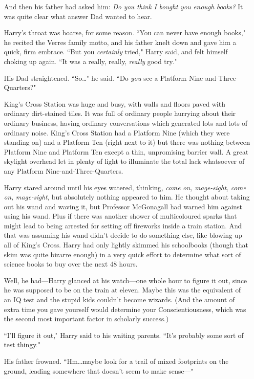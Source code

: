 And then his father had asked him: \emph{Do you think I bought you enough books?} It was quite clear what answer Dad wanted to hear.

Harry's throat was hoarse, for some reason. ``You can never have enough books," he recited the Verres family motto, and his father knelt down and gave him a quick, firm embrace. ``But you \emph{certainly} tried," Harry said, and felt himself choking up again. ``It was a really, really, \emph{really} good try."

His Dad straightened. ``So…" he said. ``Do \emph{you} see a Platform Nine-and-Three-Quarters?"

King's Cross Station was huge and busy, with walls and floors paved with ordinary dirt-stained tiles. It was full of ordinary people hurrying about their ordinary business, having ordinary conversations which generated lots and lots of ordinary noise. King's Cross Station had a Platform Nine (which they were standing on) and a Platform Ten (right next to it) but there was nothing between Platform Nine and Platform Ten except a thin, unpromising barrier wall. A great skylight overhead let in plenty of light to illuminate the total lack whatsoever of any Platform Nine-and-Three-Quarters.

Harry stared around until his eyes watered, thinking, \emph{come on, mage-sight, come on, mage-sight}, but absolutely nothing appeared to him. He thought about taking out his wand and waving it, but Professor McGonagall had warned him against using his wand. Plus if there was another shower of multicoloured sparks that might lead to being arrested for setting off fireworks inside a train station. And that was assuming his wand didn't decide to do something else, like blowing up all of King's Cross. Harry had only lightly skimmed his schoolbooks (though that skim was quite bizarre enough) in a very quick effort to determine what sort of science books to buy over the next 48 hours.

Well, he had—Harry glanced at his watch—one whole hour to figure it out, since he was supposed to be on the train at eleven. Maybe this was the equivalent of an IQ test and the stupid kids couldn't become wizards. (And the amount of extra time you gave yourself would determine your Conscientiousness, which was the second most important factor in scholarly success.)

``I'll figure it out," Harry said to his waiting parents. ``It's probably some sort of test thingy."

His father frowned. ``Hm…maybe look for a trail of mixed footprints on the ground, leading somewhere that doesn't seem to make sense—"

